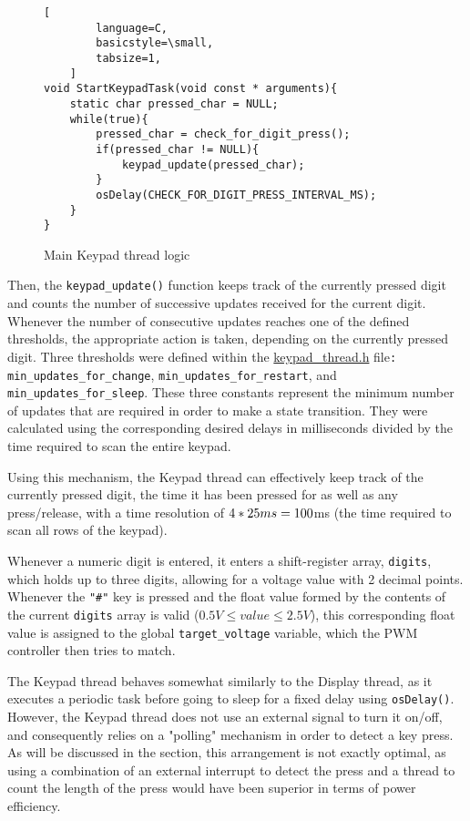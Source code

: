\begin{figure}[h]
\begin{minipage}{0.45\textwidth}	
	\begin{lstlisting}[
		language=C,
		basicstyle=\small,
		tabsize=1,
	]
void StartKeypadTask(void const * arguments){
	static char pressed_char = NULL;
	while(true){
		pressed_char = check_for_digit_press();
		if(pressed_char != NULL){
			keypad_update(pressed_char);
		}
		osDelay(CHECK_FOR_DIGIT_PRESS_INTERVAL_MS);
	}
}
	\end{lstlisting}
	\caption{\label{fig:keypad-thread-main-logic}Main Keypad thread logic}
\end{minipage}
\end{figure}

Then, the \verb|keypad_update()| function keeps track of the currently pressed digit and counts the number of successive updates received for the current digit. Whenever the number of consecutive updates reaches one of the defined thresholds, the appropriate action is taken, depending on the currently pressed digit. Three thresholds were defined within the \href{https://github.com/lebrice/MicroP/blob/master/Lab4/Src/keypad_thread.h}{keypad\_thread.h} file\verb|:| \verb|min_updates_for_change|, \verb|min_updates_for_restart|, and \verb|min_updates_for_sleep|. These three constants represent the minimum number of updates that are required in order to make a state transition. They were calculated using the corresponding desired delays in milliseconds divided by the time required to scan the entire keypad. 

Using this mechanism, the Keypad thread can effectively keep track of the currently pressed digit, the time it has been pressed for as well as any press/release, with a time resolution of $4*25ms = 100$ms (the time required to scan all rows of the keypad).


Whenever a numeric digit is entered, it enters a shift-register array, \verb|digits|, which holds up to three digits, allowing for a voltage value with 2 decimal points. Whenever the \verb|"#"| key is pressed and the float value formed by the contents of the current \verb|digits| array is valid ($0.5V \leq value \leq  2.5V$), this corresponding float value is assigned to the global \verb|target_voltage| variable, which the PWM controller then tries to match.


The Keypad thread behaves somewhat similarly to the Display thread, as it executes a periodic task before going to sleep for a fixed delay using \verb|osDelay()|. However, the Keypad thread does not use an external signal to turn it on/off, and consequently relies on a "polling" mechanism in order to detect a key press. As will be discussed in the  section, this arrangement is not exactly optimal, as using a combination of an external interrupt to detect the press and a thread to count the length of the press would have been superior in terms of power efficiency.



